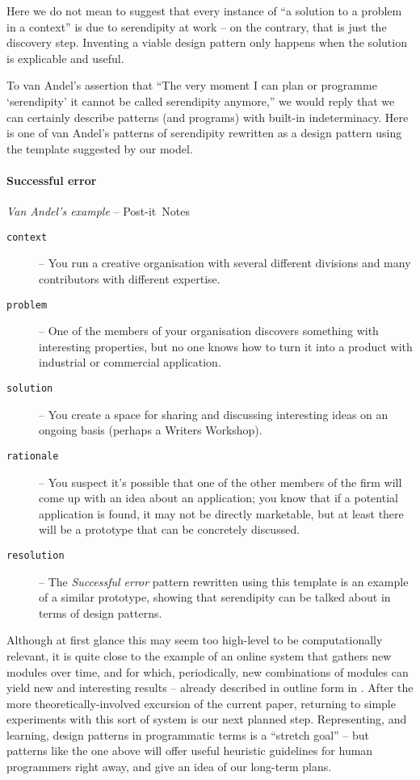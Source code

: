 Here we do not mean to suggest that every instance of ``a solution to a
problem in a context'' is due to serendipity at work -- on the
contrary, that is just the discovery step.  Inventing a viable design pattern
only happens when the solution is explicable and useful.

To van Andel's assertion that ``The very moment I can plan or
programme `serendipity' it cannot be called serendipity anymore,'' we
would reply that we can certainly describe patterns (and programs)
with built-in indeterminacy.  Here is one of van Andel's patterns of
serendipity rewritten as a design pattern using the template suggested
by our model.

\begin{mdframed}
\vspace{-.35cm}
\paragraph{Successful error}
\emph{Van Andel's example} -- Post-it\texttrademark\ Notes\\[.05cm]
\begin{description}
\item[{\tt context}] -- You run a creative organisation with several different divisions and many contributors with different expertise.  
\item[{\tt problem}] -- One of the members of your organisation
  discovers something with interesting properties, but no one
  knows how to turn it into a product with industrial or commercial application.
\item[{\tt solution}] -- You create a space for sharing and discussing
  interesting ideas on an ongoing basis (perhaps a Writers Workshop).
\item[{\tt rationale}] -- You suspect it's possible that one of the
  other members of the firm will come up with an idea about an
  application; you know that if a potential application is found, it
  may not be directly marketable, but at least there will be a
  prototype that can be concretely discussed.
\item[{\tt resolution}] -- The \emph{Successful error} pattern
  rewritten using this template is an example of a similar
  prototype, showing that serendipity can be talked about in
  terms of design patterns.
\end{description}
\end{mdframed}

\bigskip

Although at first glance this may seem too high-level to be
computationally relevant, it is quite close to the example of an
online system that gathers new modules over time, and for which,
periodically, new combinations of modules can yield new and
interesting results -- already described in outline form in
\cite{pease2013discussion}.  After the more theoretically-involved
excursion of the current paper, returning to simple experiments with
this sort of system is our next planned step.  Representing, and
learning, design patterns in programmatic terms is a ``stretch goal''
-- but patterns like the one above will offer useful heuristic
guidelines for human programmers right away, and give an idea
of our long-term plans.
